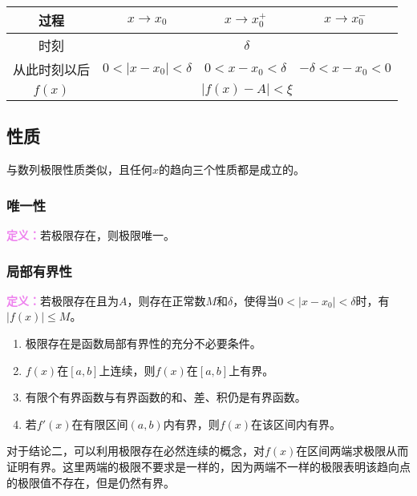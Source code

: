 \documentclass[UTF8, 12pt]{ctexart}
\begin{document}
        \begin{center}
            \begin{tabular}{|c|c|c|c|}
                \hline
                过程 & $x\to x_0$ & $x\to x_0^+$ & $x\to x_0^-$ \\ \hline
                时刻 & \multicolumn{3}{c|}{$\delta$} \\ \hline
                从此时刻以后 & $0<\vert x-x_0\vert<\delta$ & $0<x-x_0<\delta$ & $-\delta<x-x_0<0$\\ \hline
                $f(x)$ & \multicolumn{3}{c|}{$\vert f(x)-A\vert<\xi$} \\
                \hline
            \end{tabular}
        \end{center}

        \subsection{性质}

        与数列极限性质类似，且任何$x$的趋向三个性质都是成立的。

        \subsubsection{唯一性}

        \textcolor{violet}{\textbf{定义：}}若极限存在，则极限唯一。

        \subsubsection{局部有界性}

        \textcolor{violet}{\textbf{定义：}}若极限存在且为$A$，则存在正常数$M$和$\delta$，使得当$0<\vert x-x_0\vert<\delta$时，有$\vert f(x)\vert\leqslant M$。

        \begin{enumerate}
            \item 极限存在是函数局部有界性的充分不必要条件。
            \item $f(x)$在$[a,b]$上连续，则$f(x)$在$[a,b]$上有界。
            \item 有限个有界函数与有界函数的和、差、积仍是有界函数。
            \item 若$f'(x)$在有限区间$(a,b)$内有界，则$f(x)$在该区间内有界。
        \end{enumerate}

        对于结论二，可以利用极限存在必然连续的概念，对$f(x)$在区间两端求极限从而证明有界。这里两端的极限不要求是一样的，因为两端不一样的极限表明该趋向点的极限值不存在，但是仍然有界。
\end{document}
